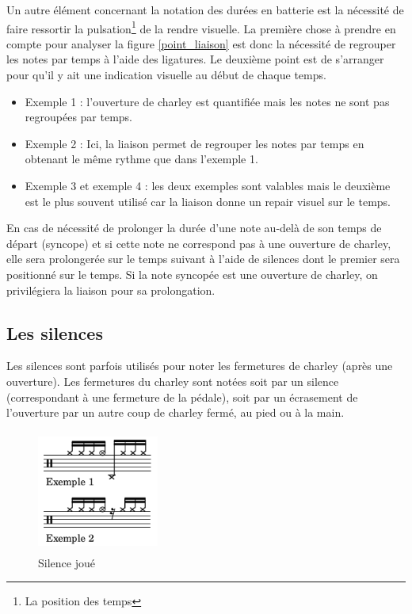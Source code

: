 Un autre élément concernant la notation des durées en batterie est la nécessité
de faire ressortir la pulsation\footnote{La position des temps} de la rendre
visuelle. La première chose à prendre en compte pour analyser la figure
\ref{point_liaison} est donc la nécessité de regrouper les notes par temps à
l’aide des ligatures. Le deuxième point est de s’arranger pour qu’il y ait une
indication visuelle au début de chaque temps.

\begin{itemize}
    \item Exemple 1 : l’ouverture de charley est quantifiée mais les notes ne
        sont pas regroupées par temps.
    \item Exemple 2 : Ici, la liaison permet de regrouper les notes par temps
        en obtenant le même rythme que dans l’exemple 1.
    \item Exemple 3 et exemple 4 : les deux exemples sont valables mais le
        deuxième est le plus souvent utilisé car la liaison donne un repair
        visuel sur le temps.\\
\end{itemize}

En cas de nécessité de prolonger la durée d’une note au-delà 
de son temps de départ (syncope) et si cette note ne correspond pas à une
ouverture de charley, elle sera prolongerée sur le temps suivant à l’aide de
silences dont le premier sera positionné sur le temps. Si la note syncopée est
une ouverture de charley, on privilégiera la liaison pour sa prolongation.

\subsection*{Les silences}
Les silences sont parfois utilisés pour noter les fermetures de charley (après
une ouverture). Les fermetures du charley sont notées soit par un silence
(correspondant à une fermeture de la pédale), soit par un écrasement de
l’ouverture par un autre coup de charley fermé, au pied ou à la main.

\begin{figure}[h]
	\centering
	\includegraphics[height=40mm, width=40mm]{
    z_images/3_methodes/0_notation_de_la_batterie/5_silence_joue.png}
	\caption{Silence joué}
	\label{silence joue}
\end{figure}

